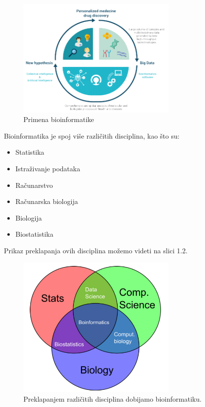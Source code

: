 \begin{figure}[h]
\caption{Primena bioinformatike}
\centering
\includegraphics[width=0.7\textwidth]{poglavlja/1/slike/Primena.png}
\end{figure} 

Bioinformatika je spoj više različitih disciplina, kao što su:
\begin{itemize}
	\item Statistika
	\item Istraživanje podataka	
	\item Računarstvo
	\item Računarska biologija
	\item Biologija
	\item Biostatistika
\end{itemize}
Prikaz preklapanja ovih disciplina možemo videti na slici 1.2.
\begin{figure}[h]
\caption{Preklapanjem različitih disciplina dobijamo bioinformatiku.}
\centering
\includegraphics[width=0.7\textwidth]{poglavlja/1/slike/Multidisciplinarnost.png}
\end{figure}  

